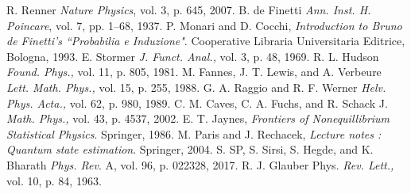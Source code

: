 \begin{thebibliography}{99}
 R. Renner \textit{Nature Physics}, vol. 3, p. 645, 2007.
 B. de Finetti \textit{Ann. Inst. H. Poincare}, vol. 7, pp. 1–68, 1937.
 P. Monari and D. Cocchi, \textit{Introduction to Bruno de Finetti's ``Probabilia e Induzione"}. Cooperative Libraria Universitaria Editrice, Bologna, 1993.
 E. Stormer \textit{J. Funct. Anal.,} vol. 3, p. 48, 1969.
 R. L. Hudson \textit{Found. Phys.,} vol. 11, p. 805, 1981.
 M. Fannes, J. T. Lewis, and A. Verbeure \textit{Lett. Math. Phys.,} vol. 15, p. 255, 1988.
 G. A. Raggio and R. F. Werner \textit{Helv. Phys. Acta.,} vol. 62, p. 980, 1989.
 C. M. Caves, C. A. Fuchs, and R. Schack J. \textit{Math. Phys.,} vol. 43, p. 4537, 2002.
 E. T. Jaynes, \textit{Frontiers of Nonequillibrium Statistical Physics}. Springer, 1986.
 M. Paris and J. Rechacek, \textit{Lecture notes : Quantum state estimation}. Springer,
2004.
 S. SP, S. Sirsi, S. Hegde, and K. Bharath \textit{Phys. Rev}. A, vol. 96, p. 022328, 2017.
 R. J. Glauber Phys. \textit{Rev. Lett.,} vol. 10, p. 84, 1963.
\end{thebibliography}
